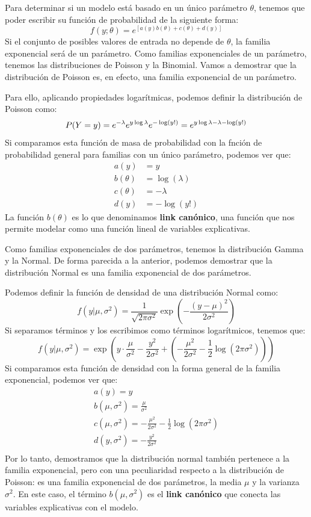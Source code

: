 \documentclass[
  letterpaper,
  DIV=11,
  numbers=noendperiod]{scrreprt}
\begin{document}
Para determinar si un modelo está basado en un único parámetro
\(\theta\), tenemos que poder escribir su función de probabilidad de la
siguiente forma: \[
f(y; \theta) = e^{[a(y)b(\theta) + c(\theta) + d(y)]}
\] Si el conjunto de posibles valores de entrada no depende de
\(\theta\), la familia exponencial será de un parámetro. Como familias
exponenciales de un parámetro, tenemos las distribuciones de Poisson y
la Binomial. Vamos a demostrar que la distribución de Poisson es, en
efecto, una familia exponencial de un parámetro.

Para ello, aplicando propiedades logarítmicas, podemos definir la
distribución de Poisson como: \[
P(Y = y) = e^{-\lambda} e^{y \log \lambda} e^{-\log(y!)} \\
= e^{y \log \lambda - \lambda - \log(y!)}
\] Si comparamos esta función de masa de probabilidad con la fnción de
probabilidad general para familias con un único parámetro, podemos ver
que: \[
\begin{aligned}
a(y) &= y \\
b(\theta) &= \log(\lambda) \\
c(\theta) &= -\lambda \\
d(y) &= -\log(y!)
\end{aligned}
\] La función \(b(\theta)\) es lo que denominamos \textbf{link
canónico}, una función que nos permite modelar como una función lineal
de variables explicativas.

Como familias exponenciales de dos parámetros, tenemos la distribución
Gamma y la Normal. De forma parecida a la anterior, podemos demostrar
que la distribución Normal es una familia exponencial de dos parámetros.

Podemos definir la función de densidad de una distribución Normal como:
\[
f(y | \mu, \sigma^2) = \frac{1}{\sqrt{2\pi\sigma^2}} \exp \left( -\frac{(y - \mu)^2}{2\sigma^2} \right)
\] Si separamos términos y los escribimos como términos logarítmicos,
tenemos que: \[
f(y | \mu, \sigma^2) = \exp \left( y \cdot \frac{\mu}{\sigma^2} - \frac{y^2}{2\sigma^2} + \left( -\frac{\mu^2}{2\sigma^2} - \frac{1}{2} \log(2\pi\sigma^2) \right) \right)
\] Si comparamos esta función de densidad con la forma general de la
familia exponencial, podemos ver que: \[
\begin{aligned}
a(y) = y\\
b(\mu, \sigma^2) = \frac{\mu}{\sigma^2}\\
c(\mu, \sigma^2) = -\frac{\mu^2}{2\sigma^2} - \frac{1}{2} \log(2\pi\sigma^2)\\
d(y, \sigma^2) = -\frac{y^2}{2\sigma^2}\\
\end{aligned}
\] Por lo tanto, demostramos que la distribución normal también
pertenece a la familia exponencial, pero con una peculiaridad respecto a
la distribución de Poisson: es una familia exponencial de dos
parámetros, la media \(\mu\) y la varianza \(\sigma^2\). En este caso,
el término \(b(\mu, \sigma^2)\) es el \textbf{link canónico} que conecta
las variables explicativas con el modelo.
\end{document}

